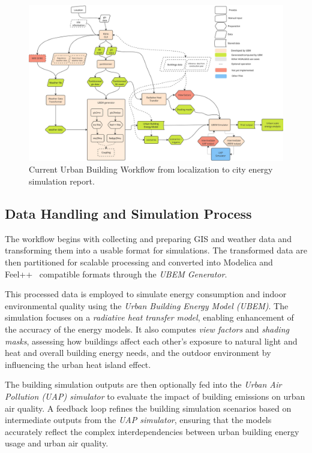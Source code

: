 \documentclass[runningheads]{llncs}
\begin{document}
\begin{figure}
    \centering
    \includegraphics[width=.9\textwidth]{img-kub-workflow.pdf}
    \caption{Current Urban Building Workflow from localization to city energy simulation report.}
    \label{fig:kub-workflow}
\end{figure}


\subsection{Data Handling and Simulation Process}
\label{sec:data-handling}

The workflow begins with collecting and preparing GIS and weather data and transforming them into a usable format for simulations. The transformed data are then partitioned for scalable processing and converted into Modelica and Feel++~\cite{christophe_prudhomme_feelppfeelpp_2024} compatible formats through the \textit{UBEM Generator}.

This processed data is employed to simulate energy consumption and indoor environmental quality using the \textit{Urban Building Energy Model (UBEM)}. The simulation focuses on a \textit{radiative heat transfer model}, enabling enhancement of the accuracy of the energy models. It also computes \textit{view factors} and \textit{shading masks}, assessing how buildings affect each other's exposure to natural light and heat and overall building energy needs, and the outdoor environment by influencing the urban heat island effect.

The building simulation outputs are then optionally fed into the \textit{Urban Air Pollution (UAP) simulator} to evaluate the impact of building emissions on urban air quality. A feedback loop refines the building simulation scenarios based on intermediate outputs from the \textit{UAP simulator}, ensuring that the models accurately reflect the complex interdependencies between urban building energy usage and urban air quality.
\end{document}
